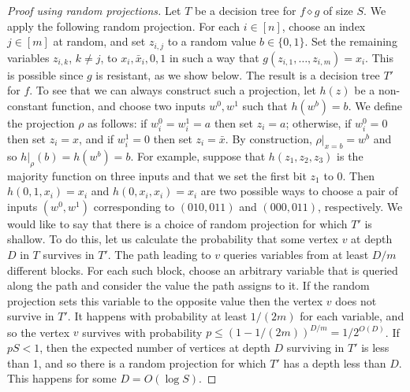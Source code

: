 \documentclass[10pt,a4paper]{article}
\newcommand{\bits}{\{0,1\}}
\newcommand{\comp}{\diamond}
\begin{document}
\begin{proof}[Proof using random projections]
Let $T$ be a decision tree for $f\comp g$ of size $S$. We apply the following random projection. For each $i\in[n]$, choose an index $j\in[m]$ at random, and set $z_{i,j}$ to a random value $b\in\bits$. Set the remaining variables $z_{i,k}$, $k\ne j$, to $x_i,\bar x_i,0,1$ in such a way that $g(z_{i,1},\ldots,z_{i,m})=x_i$. This is possible since $g$ is resistant, as we show below. The result is a decision tree $T'$ for $f$.
To see that we can always construct such a projection, let $h(z)$ be a non-constant function, and choose two inputs $w^0,w^1$ such that $h(w^b)=b$. We define the projection $\rho$ as follows: if $w_i^0=w_i^1=a$ then set $z_i=a$; otherwise, if $w_i^0=0$ then set $z_i=x$, and if $w_i^1=0$ then set $z_i=\bar x$. By construction, $\rho|_{x=b}=w^b$ and so $h|_\rho(b)=h(w^b)=b$.
For example, suppose that $h(z_1,z_2,z_3)$ is the majority function on three inputs and that we set the first bit $z_1$ to 0. Then $h(0,1,x_i)=x_i$ and $h(0,x_i,x_i)=x_i$ are two possible ways to choose a pair of inputs $(w^0,w^1)$ corresponding to $(010,011)$ and $(000,011)$, respectively.
We would like to say that there is a choice of random projection for which $T'$ is shallow. To do this, let us calculate the probability that some vertex $v$ at depth $D$ in $T$ survives in $T'$. The path leading to $v$ queries variables from at least $D/m$ different blocks. For each such block, choose an arbitrary variable that is queried along the path and consider the value the path assigns to it. If the random projection sets this variable to the opposite value then the vertex $v$ does not survive in $T'$. It happens with probability at least $1/(2m)$ for each variable, and so the vertex $v$ survives with probability $p\le(1-1/(2m))^{D/m}=1/2^{O(D)}$.
If $pS<1$, then the expected number of vertices at depth $D$ surviving in $T'$ is less than 1, and so there is a random projection for which $T'$ has a depth less than $D$. This happens for some $D=O(\log S)$.
\end{proof}
\end{document}
